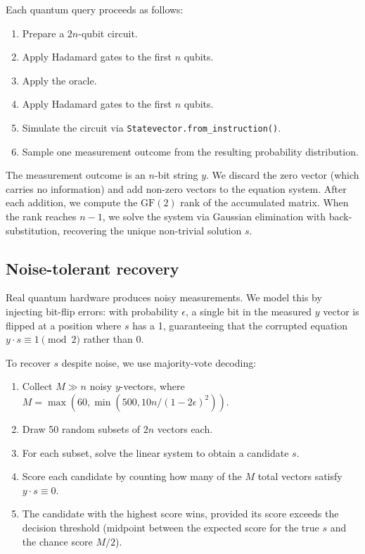 \documentclass[11pt]{article}
\begin{document}
Each quantum query proceeds as follows:

\begin{enumerate}
    \item Prepare a $2n$-qubit circuit.
    \item Apply Hadamard gates to the first $n$ qubits.
    \item Apply the oracle.
    \item Apply Hadamard gates to the first $n$ qubits.
    \item Simulate the circuit via \texttt{Statevector.from\_instruction()}.
    \item Sample one measurement outcome from the resulting probability distribution.
\end{enumerate}

The measurement outcome is an $n$-bit string $y$. We discard the zero vector (which carries no information) and add non-zero vectors to the equation system. After each addition, we compute the $\text{GF}(2)$ rank of the accumulated matrix. When the rank reaches $n-1$, we solve the system via Gaussian elimination with back-substitution, recovering the unique non-trivial solution $s$.

\subsection{Noise-tolerant recovery}

Real quantum hardware produces noisy measurements. We model this by injecting bit-flip errors: with probability $\epsilon$, a single bit in the measured $y$ vector is flipped at a position where $s$ has a 1, guaranteeing that the corrupted equation $y \cdot s \equiv 1 \pmod{2}$ rather than 0.

To recover $s$ despite noise, we use majority-vote decoding:

\begin{enumerate}
    \item Collect $M \gg n$ noisy $y$-vectors, where $M = \max(60, \min(500, 10n / (1 - 2\epsilon)^2))$.
    \item Draw 50 random subsets of $2n$ vectors each.
    \item For each subset, solve the linear system to obtain a candidate $s$.
    \item Score each candidate by counting how many of the $M$ total vectors satisfy $y \cdot s \equiv 0$.
    \item The candidate with the highest score wins, provided its score exceeds the decision threshold (midpoint between the expected score for the true $s$ and the chance score $M/2$).
\end{enumerate}
\end{document}
